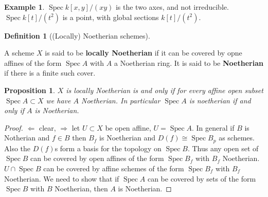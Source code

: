\documentclass[10pt,]{book}
\newcommand{\terminology}[1]{\textbf{#1}}
\theoremstyle{plain}
\newtheorem{proposition}[theorem]{Proposition}
\theoremstyle{definition}
\newtheorem{definition}[theorem]{Definition}
\newtheorem{example}[theorem]{Example}
\numberwithin{equation}{section}
\DeclareMathOperator{\Spec}{Spec}
\begin{document}
\begin{example}\label{example-3}
\(\Spec k[x,y]/(xy)\) is the two axes, and not irreducible.\newline{}\(\Spec k[t]/(t^2)\) is a point, with global sections \(k[t]/(t^2)\).\newline{}\end{example}
\begin{definition}[(Locally) Noetherian schemes]\label{definition-9}

            A scheme \(X\) is said to be \terminology{locally Noetherian} if it can be covered by opne affines of the form \(\Spec A\) with \(A\) a Noetherian ring.
            It is said to be \terminology{Noetherian} if there is a finite such cover.
          \end{definition}
\begin{proposition}\label{proposition-4}
\(X\) is locally Noetherian is and only if for every affine open subset \(\Spec A \subset X\) we have \(A\) Noetherian.
            In particular \(\Spec A\) is noetherian if and only if \(A\) is Noetherian.
          \end{proposition}
\begin{proof}
\(\Leftarrow\) clear, \(\Rightarrow\) let \(U \subset X\) be open affine, \(U = \Spec A\).
            In general if \(B\) is Notherian and \(f \in B\) then \(B_f\) is Noetherian and \(D(f) \cong \Spec B_p\) as schemes.
            Also the \(D(f)\)s form a basis for the topology on \(\Spec B\).
            Thus any open set of \(\Spec B\) can be covered by open affines of the form \(\Spec B_f \) with \(B_f\) Noetherian.
            \(U \cap \Spec B\) can be covered by affine schemes of the form \(\Spec B_f\) with \(B_f \) Noetherian.
            We need to show that if \(\Spec A\) can be covered by sets of the form \(\Spec B\) with \(B\) Noetherian, then \(A\) is Noetherian.
          \end{proof}
%
\backmatter
%
\end{document}
